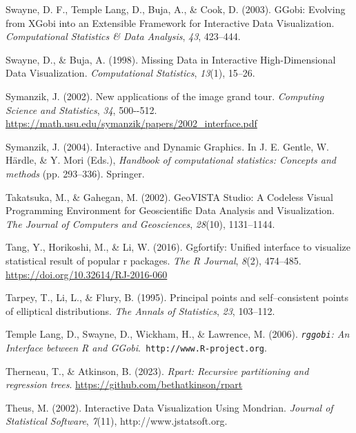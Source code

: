 \documentclass[
  letterpaper,
]{krantz}
\newlength{\cslhangindent}
\newenvironment{CSLReferences}[2] %
 {\begin{list}{}{%
  \setlength{\itemindent}{0pt}
  \setlength{\leftmargin}{0pt}
  \setlength{\parsep}{0pt}
  \ifodd #1
   \setlength{\leftmargin}{\cslhangindent}
   \setlength{\itemindent}{-1\cslhangindent}
  \fi
  \setlength{\itemsep}{#2\baselineskip}}}
 {\end{list}}
\begin{document}
\begin{CSLReferences}{1}{0}
Swayne, D. F., Temple Lang, D., Buja, A., \& Cook, D. (2003). {GG}obi:
{E}volving from {XG}obi into an {E}xtensible {F}ramework for
{I}nteractive {D}ata {V}isualization. \emph{Computational Statistics \&
Data Analysis}, \emph{43}, 423--444.

Swayne, D., \& Buja, A. (1998). {M}issing {D}ata in {I}nteractive
{H}igh-{D}imensional {D}ata {V}isualization. \emph{Computational
Statistics}, \emph{13}(1), 15--26.

Symanzik, J. (2002). New applications of the image grand tour.
\emph{Computing Science and Statistics}, \emph{34}, 500-\/-512.
\url{https://math.usu.edu/symanzik/papers/2002_interface.pdf}

Symanzik, J. (2004). Interactive and {D}ynamic {G}raphics. In J. E.
Gentle, W. Härdle, \& Y. Mori (Eds.), \emph{Handbook of computational
statistics: Concepts and methods} (pp. 293--336). Springer.

Takatsuka, M., \& Gahegan, M. (2002). {GeoVISTA Studio}: A {C}odeless
{V}isual {P}rogramming {E}nvironment for {G}eoscientific {D}ata
{A}nalysis and {V}isualization. \emph{The Journal of Computers and
Geosciences}, \emph{28}(10), 1131--1144.

Tang, Y., Horikoshi, M., \& Li, W. (2016). Ggfortify: Unified interface
to visualize statistical result of popular r packages. \emph{The R
Journal}, \emph{8}(2), 474--485.
\url{https://doi.org/10.32614/RJ-2016-060}

Tarpey, T., Li, L., \& Flury, B. (1995). Principal points and
self--consistent points of elliptical distributions. \emph{The Annals of
Statistics}, \emph{23}, 103--112.

Temple Lang, D., Swayne, D., Wickham, H., \& Lawrence, M. (2006).
\emph{{\texttt{rggobi}}: {A}n {I}nterface between {R} and
{GG}obi}.{\texttt{\ http://www.R-project.org}}.

Therneau, T., \& Atkinson, B. (2023). \emph{Rpart: Recursive
partitioning and regression trees}.
\url{https://github.com/bethatkinson/rpart}

Theus, M. (2002). Interactive {D}ata {V}isualization {U}sing {M}ondrian.
\emph{Journal of Statistical Software}, \emph{7}(11),
http://www.jstatsoft.org.


\end{CSLReferences}
\end{document}
